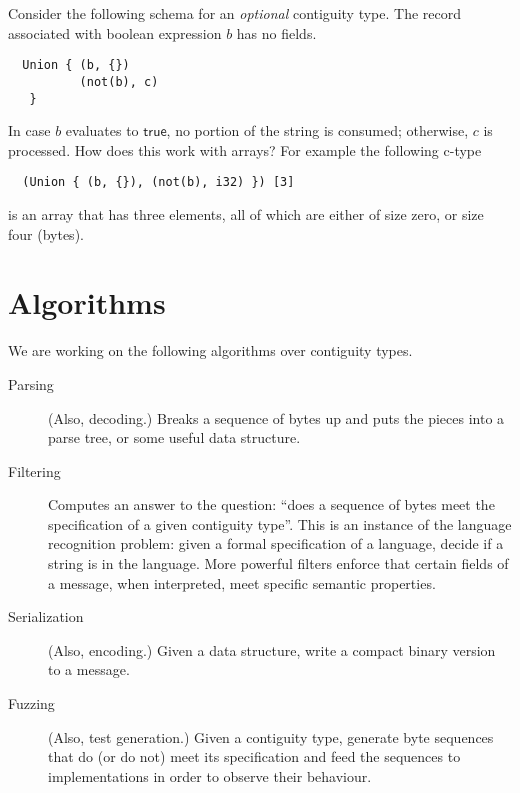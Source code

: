 \documentclass[svgnames]{llncs}
\newcommand{\konst}[1]{\ensuremath{\mathsf{#1}}}
\begin{document}
\begin{example}
Consider the following schema for an \emph{optional} contiguity
type. The record associated with boolean expression $b$ has no fields.

\begin{verbatim}
  Union { (b, {})
          (not(b), c)
   }
\end{verbatim}

In case $\mathit{b}$ evaluates to \konst{true}, no portion of the
string is consumed; otherwise, $c$ is processed. How does this work
with arrays? For example the following c-type

\begin{verbatim}
  (Union { (b, {}), (not(b), i32) }) [3]
\end{verbatim}

is an array that has three elements, all of which are either of
size zero, or size four (bytes).

\end{example}

\section{Algorithms}

We are working on the following algorithms over contiguity types.

\begin{description}

\item [Parsing] (Also, decoding.) Breaks a sequence of bytes up and puts the
  pieces into a parse tree, or some useful data structure.

\item [Filtering] Computes an answer to the question: ``does a
  sequence of bytes meet the specification of a given contiguity
  type''. This is an instance of the language recognition problem:
  given a formal specification of a language, decide if a string is in
  the language. More powerful filters enforce that certain fields of a
  message, when interpreted, meet specific semantic properties.

\item [Serialization] (Also, encoding.) Given a data structure, write a compact
  binary version to a message.

\item [Fuzzing] (Also, test generation.) Given a contiguity type, generate
  byte sequences that do (or do not) meet its specification and feed
  the sequences to implementations in order to observe their behaviour.

\end{description}
\end{document}
